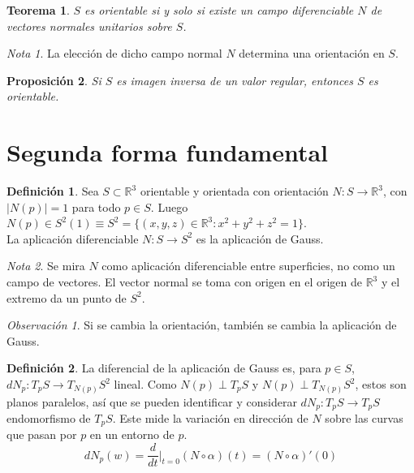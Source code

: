 \documentclass{report}
\newtheorem{theorem}{Teorema}[chapter]
\newtheorem{proposition}[theorem]{Proposición}
\theoremstyle{remark}
\newtheorem*{remark}{Observación}
\theoremstyle{remark}
\newtheorem*{note}{Nota}
\theoremstyle{definition}
\newtheorem{definition}{Definición}[chapter]
\theoremstyle{definition}
\theoremstyle{definition}
\begin{document}
\begin{theorem}
    $S$ es orientable si y solo si existe un campo diferenciable $N$ de vectores normales unitarios sobre $S$.
\end{theorem}

\begin{note}
    La elección de dicho campo normal $N$ determina una orientación en $S$.
\end{note}

\begin{proposition}
    Si $S$ es imagen inversa de un valor regular, entonces $S$ es orientable.
\end{proposition}

\section{Segunda forma fundamental}

\begin{definition}
    Sea $S \subset \mathbb{R}^3$ orientable y orientada con orientación $N : S \to \mathbb{R}^3$, con $|N(p)| = 1$ para todo $p \in S$.
    Luego $N(p) \in S^2(1) \equiv S^2 = \{ (x, y, z) \in \mathbb{R}^3 : x^2+y^2+z^2 = 1 \}$.\\
    La aplicación diferenciable $N : S \to S^2$ es la aplicación de Gauss.
\end{definition}

\begin{note}
    Se mira $N$ como aplicación diferenciable entre superficies, no como un campo de vectores.
    El vector normal se toma con origen en el origen de $\mathbb{R}^3$ y el extremo da un punto de $S^2$.
\end{note}

\begin{remark}
    Si se cambia la orientación, también se cambia la aplicación de Gauss.
\end{remark}

\begin{definition}
    La diferencial de la aplicación de Gauss es, para $p \in S$, $dN_p : T_pS \to T_{N(p)}S^2$ lineal.
    Como $N(p) \perp T_pS$ y $N(p) \perp T_{N(p)}S^2$, estos son planos paralelos, así que se pueden identificar y considerar $dN_p : T_pS \to T_pS$ endomorfismo de $T_pS$.
    Este mide la variación en dirección de $N$ sobre las curvas que pasan por $p$ en un entorno de $p$.
    $$dN_p(w) = \frac{d}{dt}|_{t=0} (N \circ \alpha)(t) = (N \circ \alpha)'(0)$$
\end{definition}
\end{document}

